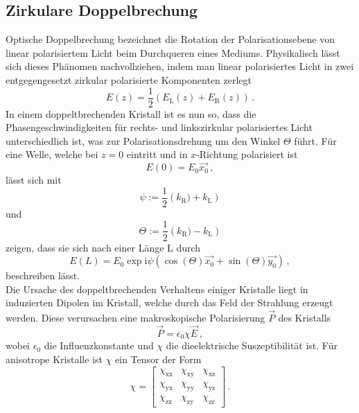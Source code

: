 \subsection{Zirkulare Doppelbrechung}
Optische Doppelbrechung bezeichnet die Rotation der Polarisationsebene von linear polarisiertem Licht beim Durchqueren eines Mediums. Physikalisch lässt sich dieses Phänomen nachvollziehen, indem man linear polarisiertes Licht in zwei entgegengesetzt zirkular polarisierte Komponenten zerlegt
\begin{equation}
E(z)=\frac{1}{2}(E_\text{L}(z)+E_\text{R}(z))\,.
\end{equation}
In einem doppeltbrechenden Kristall ist es nun so, dass die Phasengeschwindigkeiten für rechts- und linkszirkular polarisiertes Licht unterschiedlich ist, was zur Polarisationsdrehung um den Winkel $\Theta$ führt. Für eine Welle, welche bei $z=0$ eintritt und in $x$-Richtung polarisiert ist
\begin{equation}
  E(0)=E_0\vec{x_0}\,,
\end{equation}
lässt sich mit
\begin{equation}
  \psi:=\frac{1}{2}\left(k_\text{R})+k_\text{L}\right)
\end{equation}
und
\begin{equation}
\Theta:=\frac{1}{2}\left(k_\text{R})-k_\text{L}\right)
\end{equation}
zeigen, dass sie sich nach einer Länge L durch
\begin{equation}
E(L)=E_0 \exp{\text{i}\psi}\left(\cos(\Theta)\vec{x_0}+\sin(\Theta)\vec{y_0}\right)\,,
\end{equation}
beschreiben lässt.\\
Die Ursache des doppeltbrechenden Verhaltens einiger Kristalle liegt in induzierten Dipolen im Kristall, welche durch das Feld der Strahlung erzeugt werden. Diese verursachen eine makroskopische Polarisierung $\vec{P}$ des Kristalls
\begin{equation}
\vec{P}=\epsilon_0\chi\vec{E}\,,
\end{equation}
wobei $\epsilon_0$ die Influenzkonstante und $\chi$ die dieelektrische Suszeptibilität ist.
Für anisotrope Kristalle ist $\chi$ ein Tensor der Form
\begin{equation}
  \chi=
  \left[ {\begin{array}{ccc}
   \chi_\text{xx} & \chi_\text{xy} & \chi_\text{xz}\\
   \chi_\text{yx} & \chi_\text{yy} & \chi_\text{yz}\\
   \chi_\text{zx} & \chi_\text{zy} &\chi_\text{zz}
  \end{array} } \right]\,.
\end{equation}
